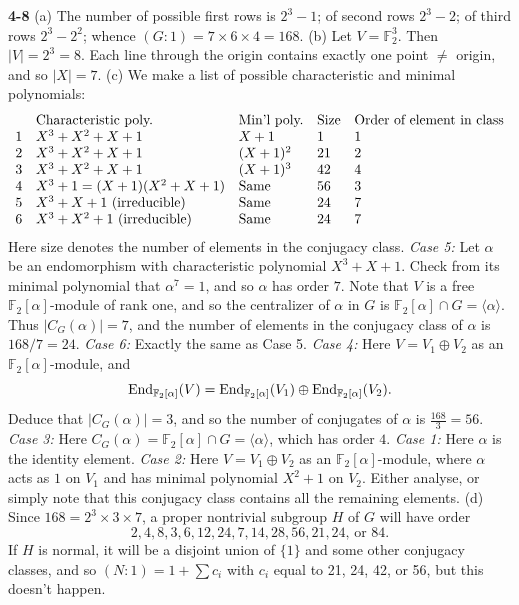 \documentclass[a4paper,11pt,final]{memoir}%
\theoremstyle{nonumberplain}
\begin{document}
\bigskip\noindent\textbf{4-8}
(a) The number of possible first rows is $2^{3}-1$; of second rows $2^{3}-2$;
of third rows $2^{3}-2^{2}$; whence $(G:1)=7\times6\times4=168$. \noindent(b)
Let $V=\mathbb{F}_{2}^{3}$. Then $|V|=2^{3}=8$. Each line through the origin
contains exactly one point $\neq$ origin, and so $|X|=7$. \noindent(c) We make
a list of possible characteristic and minimal polynomials:
\[%
\begin{array}
[c]{lllll}
& \text{Characteristic poly.} & \text{Min'l poly.} & \text{Size} & \text{Order
of element in class}\\
1 & X^{3}+X^{2}+X+1 & X+1 & 1 & 1\\
2 & X^{3}+X^{2}+X+1 & (X+1)^{2} & 21 & 2\\
3 & X^{3}+X^{2}+X+1 & (X+1)^{3} & 42 & 4\\
4 & X^{3}+1=(X+1)(X^{2}+X+1) & \text{Same} & 56 & 3\\
5 & X^{3}+X+1\text{ (irreducible)} & \text{Same} & 24 & 7\\
6 & X^{3}+X^{2}+1\text{ (irreducible)} & \text{Same} & 24 & 7
\end{array}
\]
Here size denotes the number of elements in the conjugacy class.
\noindent\textit{Case 5:\/} Let $\alpha$ be an endomorphism with
characteristic polynomial $X^{3}+X+1$. Check from its minimal polynomial that
$\alpha^{7}=1$, and so $\alpha$ has order $7$. Note that $V$ is a free
$\mathbb{F}_{2}[\alpha]$-module of rank one, and so the centralizer of
$\alpha$ in $G$ is $\mathbb{F}_{2}[\alpha]\cap G=\langle\alpha\rangle$. Thus
$|C_{G}(\alpha)|=7$, and the number of elements in the conjugacy class of
$\alpha$ is $168/7=24$. \noindent\textit{Case 6:\/} Exactly the same as Case
5. \noindent\textit{Case 4:\/} Here $V=V_{1}\oplus V_{2}$ as an $\mathbb{F}%
_{2}[\alpha]$-module, and
\[
\End_{\mathbb{F}_{2}[\alpha]}(V)=\End_{\mathbb{F}_{2}[\alpha]}(V_{1}%
)\oplus\End_{\mathbb{F}_{2}[\alpha]}(V_{2}).
\]
Deduce that $|C_{G}(\alpha)|=3$, and so the number of conjugates of $\alpha$
is $\frac{168}{3}=56$. \noindent\textit{Case 3:\/} Here $C_{G}(\alpha
)=\mathbb{F}_{2}[\alpha]\cap G=\langle\alpha\rangle$, which has order $4$.
\noindent\textit{Case 1:\/} Here $\alpha$ is the identity element.
\noindent\textit{Case 2:\/} Here $V=V_{1}\oplus V_{2}$ as an $\mathbb{F}%
_{2}[\alpha]$-module, where $\alpha$ acts as $1$ on $V_{1}$ and has minimal
polynomial $X^{2}+1$ on $V_{2}$. Either analyse, or simply note that this
conjugacy class contains all the remaining elements. \noindent(d) Since
$168=2^{3}\times3\times7$, a proper nontrivial subgroup $H$ of $G$ will have
order
\[
2,4,8,3,6,12,24,7,14,28,56,21,24\text{, or }84.
\]
If $H$ is normal, it will be a disjoint union of $\{1\}$ and some other
conjugacy classes, and so $(N:1)=1+\sum c_{i}$ with $c_{i}$ equal to 21, 24,
42, or 56, but this doesn't happen.
\end{document}
